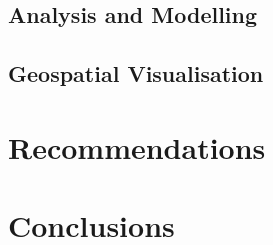 \documentclass[11pt]{article}
\begin{document}
\subsection{Analysis and Modelling}







\subsection{Geospatial Visualisation}

\section{Recommendations}

\section{Conclusions}


\clearpage

\printbibliography
\end{document}
